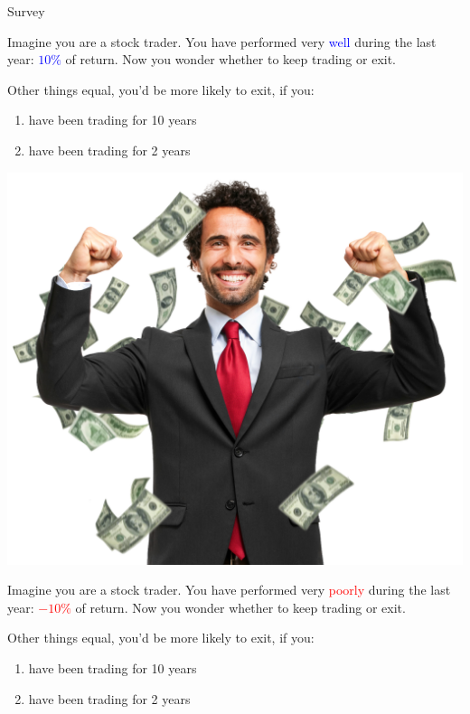 \documentclass{beamer}
\begin{document}
\begin{frame}[allowframebreaks]{Survey}
	\begin{block}{}
		Imagine you are a stock trader. You have performed very \textcolor{blue}{well} during the last year:
		\textcolor{blue}{$10\%$} of return. Now you wonder whether to keep trading or exit.
	\end{block}

Other things equal, you'd be more likely to exit, if you:

\begin{enumerate}[A]
	\item have been trading for 10 years
	\item have been trading for 2 years
\end{enumerate}

\includegraphics[scale=0.1]{figures/happymoney}

\framebreak

	\begin{block}{}
		Imagine you are a stock trader. You have performed very \textcolor{red}{poorly} during the last year:
		\textcolor{red}{$-10\%$} of return. Now you wonder whether to keep trading or exit.
	\end{block}
	
	Other things equal, you'd be more likely to exit, if you:
	
	\begin{enumerate}[A]
		\item have been trading for 10 years
		\item have been trading for 2 years
	\end{enumerate}
	

\end{frame}
\end{document}
